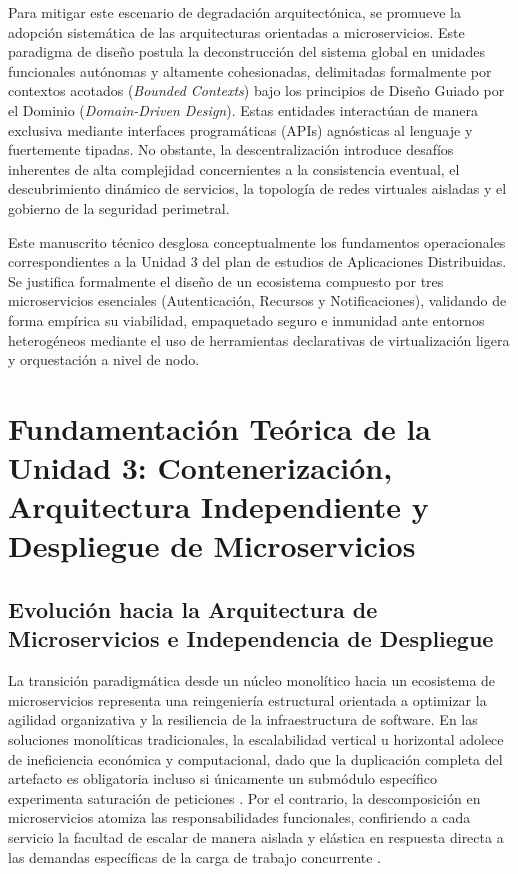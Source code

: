 \documentclass[12pt,journal,onecolumn]{IEEEtran}
\begin{document}
Para mitigar este escenario de degradación arquitectónica, se promueve la adopción sistemática de las arquitecturas orientadas a microservicios. Este paradigma de diseño postula la deconstrucción del sistema global en unidades funcionales autónomas y altamente cohesionadas, delimitadas formalmente por contextos acotados (\textit{Bounded Contexts}) bajo los principios de Diseño Guiado por el Dominio (\textit{Domain-Driven Design}). Estas entidades interactúan de manera exclusiva mediante interfaces programáticas (APIs) agnósticas al lenguaje y fuertemente tipadas. No obstante, la descentralización introduce desafíos inherentes de alta complejidad concernientes a la consistencia eventual, el descubrimiento dinámico de servicios, la topología de redes virtuales aisladas y el gobierno de la seguridad perimetral.

Este manuscrito técnico desglosa conceptualmente los fundamentos operacionales correspondientes a la Unidad 3 del plan de estudios de Aplicaciones Distribuidas. Se justifica formalmente el diseño de un ecosistema compuesto por tres microservicios esenciales (Autenticación, Recursos y Notificaciones), validando de forma empírica su viabilidad, empaquetado seguro e inmunidad ante entornos heterogéneos mediante el uso de herramientas declarativas de virtualización ligera y orquestación a nivel de nodo.

\newpage


\section{\textbf{Fundamentación Teórica de la Unidad 3: Contenerización, Arquitectura Independiente y Despliegue de Microservicios}}

\subsection{\textbf{Evolución hacia la Arquitectura de Microservicios e Independencia de Despliegue}}
La transición paradigmática desde un núcleo monolítico hacia un ecosistema de microservicios representa una reingeniería estructural orientada a optimizar la agilidad organizativa y la resiliencia de la infraestructura de software. En las soluciones monolíticas tradicionales, la escalabilidad vertical u horizontal adolece de ineficiencia económica y computacional, dado que la duplicación completa del artefacto es obligatoria incluso si únicamente un submódulo específico experimenta saturación de peticiones \cite{newman2021}. Por el contrario, la descomposición en microservicios atomiza las responsabilidades funcionales, confiriendo a cada servicio la facultad de escalar de manera aislada y elástica en respuesta directa a las demandas específicas de la carga de trabajo concurrente \cite{newman2021, richardson2018}.
\end{document}
